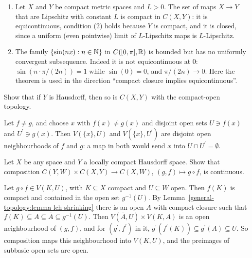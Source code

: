 \begin{example}\label{general-topology:example-arzela-ascoli}
\begin{enumerate}
\item Let $X$ and $Y$ be compact metric spaces and $L > 0$. The set of maps $X \to Y$ that are Lipschitz with constant $L$ is compact in $C(X, Y)$: it is equicontinuous, condition (2) holds because
$Y$ is compact, and it is closed, since a uniform (even pointwise) limit of $L$-Lipschitz maps is $L$-Lipschitz.
\item The family $\{\sin(nx) : n \in \mathbb{N}\}$ in $C([0, \pi], \mathbb{R})$ is bounded but has no uniformly convergent subsequence. Indeed it is not equicontinuous at $0$: $\sin(n \cdot \pi/(2n)) = 1$ while
$\sin(0) = 0$, and $\pi/(2n) \to 0$. Here the theorem is used in the direction ``compact closure implies equicontinuous''.
\end{enumerate}
\end{example}

\begin{exercise}\label{general-topology:exercise-compact-open-hausdorff}
Show that if $Y$ is Hausdorff, then so is $C(X, Y)$ with the compact-open topology.
\end{exercise}

\begin{solution}
Let $f \neq g$, and choose $x$ with $f(x) \neq g(x)$ and disjoint open sets $U \ni f(x)$ and $U^{\prime} \ni g(x)$. Then $V(\{x\}, U)$ and $V(\{x\}, U^{\prime})$ are disjoint open neighbourhoods of
$f$ and $g$: a map in both would send $x$ into $U \cap U^{\prime} = \emptyset$.
\end{solution}

\begin{exercise}\label{general-topology:exercise-composition}
Let $X$ be any space and $Y$ a locally compact Hausdorff space. Show that composition $C(Y, W) \times C(X, Y) \to C(X, W)$, $(g, f) \mapsto g \circ f$, is continuous.
\end{exercise}

\begin{solution}
Let $g \circ f \in V(K, U)$, with $K \subseteq X$ compact and $U \subseteq W$ open. Then $f(K)$ is compact and contained in the open set $g^{-1}(U)$. By Lemma~\ref{general-topology:lemma-lch-shrinking}
there is an open $A$ with compact closure such that $f(K) \subseteq A \subseteq \overline{A} \subseteq g^{-1}(U)$. Then $V(\overline{A}, U) \times V(K, A)$ is an open neighbourhood of $(g, f)$, and for
$(g^{\prime}, f^{\prime})$ in it, $g^{\prime}(f^{\prime}(K)) \subseteq g^{\prime}(A) \subseteq U$. So composition maps this neighbourhood into $V(K, U)$, and the preimages of subbasic open sets are open.
\end{solution}

